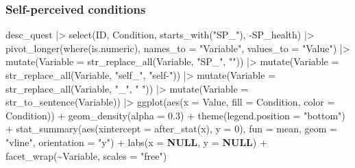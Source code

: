 \documentclass[
  bookmarksnumbered]{article}
\newenvironment{Shaded}{\begin{snugshade}}{\end{snugshade}}
\newcommand{\AttributeTok}[1]{\textcolor[rgb]{0.80,0.80,0.80}{#1}}
\newcommand{\ConstantTok}[1]{\textcolor[rgb]{0.86,0.64,0.64}{\textbf{#1}}}
\newcommand{\DecValTok}[1]{\textcolor[rgb]{0.86,0.86,0.80}{#1}}
\newcommand{\FloatTok}[1]{\textcolor[rgb]{0.75,0.75,0.82}{#1}}
\newcommand{\FunctionTok}[1]{\textcolor[rgb]{0.94,0.94,0.56}{#1}}
\newcommand{\NormalTok}[1]{\textcolor[rgb]{0.80,0.80,0.80}{#1}}
\newcommand{\SpecialCharTok}[1]{\textcolor[rgb]{0.86,0.64,0.64}{#1}}
\newcommand{\StringTok}[1]{\textcolor[rgb]{0.80,0.58,0.58}{#1}}
\begin{document}
\subsubsection{Self-perceived conditions}\label{self-perceived-conditions}

\begin{Shaded}
\begin{Highlighting}[]
\NormalTok{desc\_quest }\SpecialCharTok{|\textgreater{}}
  \FunctionTok{select}\NormalTok{(ID, Condition, }\FunctionTok{starts\_with}\NormalTok{(}\StringTok{"SP\_"}\NormalTok{), }\SpecialCharTok{{-}}\NormalTok{SP\_health) }\SpecialCharTok{|\textgreater{}}
  \FunctionTok{pivot\_longer}\NormalTok{(}\FunctionTok{where}\NormalTok{(is.numeric),}
               \AttributeTok{names\_to =} \StringTok{"Variable"}\NormalTok{,}
               \AttributeTok{values\_to =} \StringTok{"Value"}\NormalTok{) }\SpecialCharTok{|\textgreater{}} 
  \FunctionTok{mutate}\NormalTok{(}\AttributeTok{Variable =} \FunctionTok{str\_replace\_all}\NormalTok{(Variable, }\StringTok{"SP\_"}\NormalTok{, }\StringTok{""}\NormalTok{)) }\SpecialCharTok{|\textgreater{}}
  \FunctionTok{mutate}\NormalTok{(}\AttributeTok{Variable =} \FunctionTok{str\_replace\_all}\NormalTok{(Variable, }\StringTok{"self\_"}\NormalTok{, }\StringTok{"self{-}"}\NormalTok{)) }\SpecialCharTok{|\textgreater{}}
  \FunctionTok{mutate}\NormalTok{(}\AttributeTok{Variable =} \FunctionTok{str\_replace\_all}\NormalTok{(Variable, }\StringTok{"\_"}\NormalTok{, }\StringTok{" "}\NormalTok{)) }\SpecialCharTok{|\textgreater{}}
  \FunctionTok{mutate}\NormalTok{(}\AttributeTok{Variable =} \FunctionTok{str\_to\_sentence}\NormalTok{(Variable)) }\SpecialCharTok{|\textgreater{}} 
  \FunctionTok{ggplot}\NormalTok{(}\FunctionTok{aes}\NormalTok{(}\AttributeTok{x =}\NormalTok{ Value, }\AttributeTok{fill =}\NormalTok{ Condition, }\AttributeTok{color =}\NormalTok{ Condition)) }\SpecialCharTok{+}
  \FunctionTok{geom\_density}\NormalTok{(}\AttributeTok{alpha =} \FloatTok{0.3}\NormalTok{) }\SpecialCharTok{+}
  \FunctionTok{theme}\NormalTok{(}\AttributeTok{legend.position =} \StringTok{"bottom"}\NormalTok{) }\SpecialCharTok{+}
  \FunctionTok{stat\_summary}\NormalTok{(}\FunctionTok{aes}\NormalTok{(}\AttributeTok{xintercept =} \FunctionTok{after\_stat}\NormalTok{(x), }\AttributeTok{y =} \DecValTok{0}\NormalTok{),}
               \AttributeTok{fun =}\NormalTok{ mean, }\AttributeTok{geom =} \StringTok{"vline"}\NormalTok{, }\AttributeTok{orientation =} \StringTok{"y"}\NormalTok{) }\SpecialCharTok{+}
  \FunctionTok{labs}\NormalTok{(}\AttributeTok{x =} \ConstantTok{NULL}\NormalTok{, }\AttributeTok{y =} \ConstantTok{NULL}\NormalTok{) }\SpecialCharTok{+}
  \FunctionTok{facet\_wrap}\NormalTok{(}\SpecialCharTok{\textasciitilde{}}\NormalTok{Variable, }\AttributeTok{scales =} \StringTok{"free"}\NormalTok{)}
\end{Highlighting}
\end{Shaded}
\end{document}
